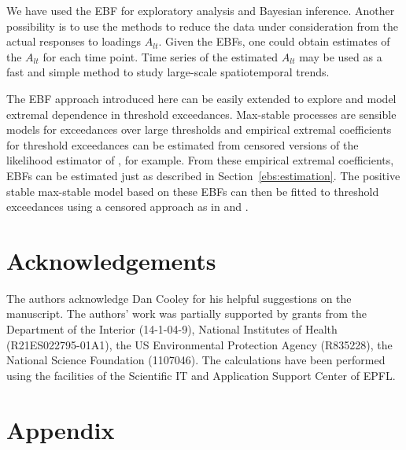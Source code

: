 \documentclass[12pt]{article}
\newcommand{\sref}[1]{Section~\ref{#1}}
\begin{document}
We have used the EBF for exploratory analysis and Bayesian inference. Another possibility is to use the methods to reduce the data under consideration from the actual responses to loadings $A_{lt}$.
Given the EBFs, one could obtain estimates of the $A_{lt}$ for each time point.  Time series of the estimated $A_{lt}$ may be used as a fast and simple method to study large-scale spatiotemporal trends.

The EBF approach introduced here can be easily extended to explore and model extremal dependence in threshold exceedances. Max-stable processes are sensible models for exceedances over large thresholds and empirical extremal coefficients for threshold exceedances can be estimated from censored versions of the likelihood estimator of \citet{Schlather2003}, for example. From these empirical extremal coefficients, EBFs can be estimated just as described in \sref{ebs:estimation}. The positive stable max-stable model based on these EBFs can then be fitted to threshold exceedances using a censored approach as in \citet{Reich2014} and \citet{Morris2016}.

\section*{Acknowledgements}
The authors acknowledge Dan Cooley for his helpful suggestions on the manuscript.
The authors' work was partially supported by grants from the Department of the Interior (14-1-04-9), National Institutes of Health (R21ES022795-01A1), the US Environmental Protection Agency (R835228), the National Science Foundation (1107046). The calculations have been performed using the facilities of the Scientific IT and Application Support Center of EPFL. 

\appendix
\section{Appendix}
\end{document}
